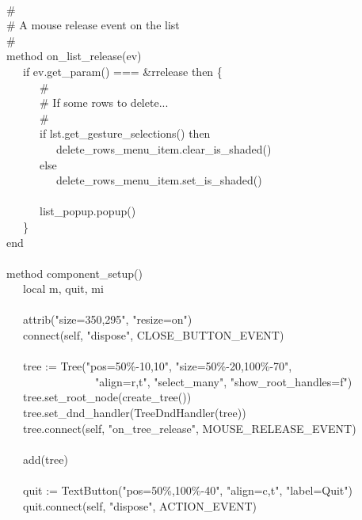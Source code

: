 {\ \\
\>   \# \\
\>   \# A mouse release event on the list \\
\>   \# \\
\>   method on\_list\_release(ev) \\
\>   \ \ \ if ev.get\_param() === \&rrelease then \{ \\
\>   \ \ \ \ \ \ \# \\
\>   \ \ \ \ \ \ \# If some rows to delete... \\
\>   \ \ \ \ \ \ \# \\
\>   \ \ \ \ \ \ if lst.get\_gesture\_selections() then \\
\>   \ \ \ \ \ \ \ \ \ delete\_rows\_menu\_item.clear\_is\_shaded() \\
\>   \ \ \ \ \ \ else \\
\>   \ \ \ \ \ \ \ \ \ delete\_rows\_menu\_item.set\_is\_shaded() \\
\ \\
\>   \ \ \ \ \ \ list\_popup.popup() \\
\>   \ \ \ \} \\
\>   end \\
\ \\
\>   method component\_setup() \\
\>   \ \ \ local m, quit, mi \\
\ \\
\>   \ \ \ attrib("size=350,295",
"resize=on") \\
\>   \ \ \ connect(self, "dispose",
CLOSE\_BUTTON\_EVENT) \\
\ \\
\>   \ \ \ tree := Tree("pos=50\%-10,10",
"size=50\%-20,100\%-70", \\
\>   \ \ \ \ \ \ \ \ \ \ \ \ \ \ \ \ "align=r,t",
"select\_many",
"show\_root\_handles=f") \\
\>   \ \ \ tree.set\_root\_node(create\_tree()) \\
\>   \ \ \ tree.set\_dnd\_handler(TreeDndHandler(tree)) \\
\>   \ \ \ tree.connect(self,
"on\_tree\_release",
MOUSE\_RELEASE\_EVENT) \\
\ \\
\>   \ \ \ add(tree) \\
\ \\
\>   \ \ \ quit :=
TextButton("pos=50\%,100\%-40",
"align=c,t",
"label=Quit") \\
\>   \ \ \ quit.connect(self, "dispose",
ACTION\_EVENT) \\
}
